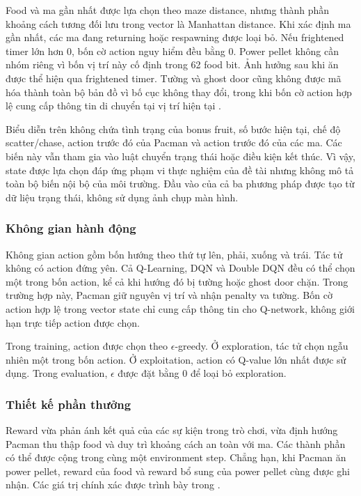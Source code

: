 Food và ma gần nhất được lựa chọn theo maze distance, nhưng thành phần khoảng cách tương đối lưu trong vector là Manhattan distance. Khi xác định ma gần nhất, các ma đang returning hoặc respawning được loại bỏ. Nếu frightened timer lớn hơn $0$, bốn cờ action nguy hiểm đều bằng $0$. Power pellet không cần nhóm riêng vì bốn vị trí này cố định trong 62 food bit. Ảnh hưởng sau khi ăn được thể hiện qua frightened timer. Tường và ghost door cũng không được mã hóa thành toàn bộ bản đồ vì bố cục không thay đổi, trong khi bốn cờ action hợp lệ cung cấp thông tin di chuyển tại vị trí hiện tại \cite{DRLPacmanGitHub}.

Biểu diễn trên không chứa tình trạng của bonus fruit, số bước hiện tại, chế độ scatter/chase, action trước đó của Pacman và action trước đó của các ma. Các biến này vẫn tham gia vào luật chuyển trạng thái hoặc điều kiện kết thúc. Vì vậy, state được lựa chọn đáp ứng phạm vi thực nghiệm của đề tài nhưng không mô tả toàn bộ biến nội bộ của môi trường. Đầu vào của cả ba phương pháp được tạo từ dữ liệu trạng thái, không sử dụng ảnh chụp màn hình.

\subsubsection{Không gian hành động}

Không gian action gồm bốn hướng theo thứ tự lên, phải, xuống và trái. Tác tử không có action đứng yên. Cả Q-Learning, DQN và Double DQN đều có thể chọn một trong bốn action, kể cả khi hướng đó bị tường hoặc ghost door chặn. Trong trường hợp này, Pacman giữ nguyên vị trí và nhận penalty va tường. Bốn cờ action hợp lệ trong vector state chỉ cung cấp thông tin cho Q-network, không giới hạn trực tiếp action được chọn.

Trong training, action được chọn theo $\epsilon$-greedy. Ở exploration, tác tử chọn ngẫu nhiên một trong bốn action. Ở exploitation, action có Q-value lớn nhất được sử dụng. Trong evaluation, $\epsilon$ được đặt bằng $0$ để loại bỏ exploration.

\subsubsection{Thiết kế phần thưởng}

Reward vừa phản ánh kết quả của các sự kiện trong trò chơi, vừa định hướng Pacman thu thập food và duy trì khoảng cách an toàn với ma. Các thành phần có thể được cộng trong cùng một environment step. Chẳng hạn, khi Pacman ăn power pellet, reward của food và reward bổ sung của power pellet cùng được ghi nhận. Các giá trị chính xác được trình bày trong .

